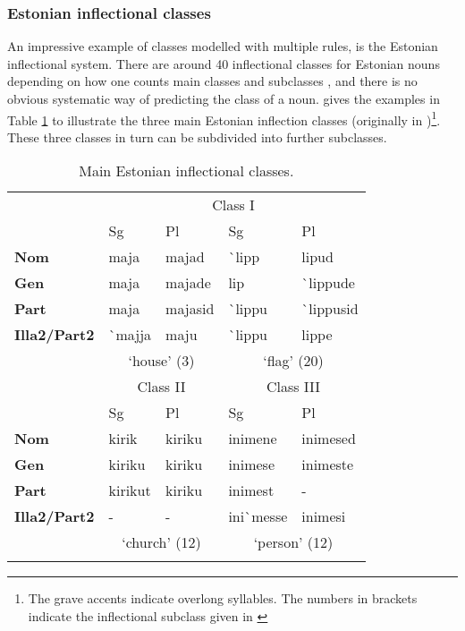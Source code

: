 \subsubsection{Estonian inflectional classes}

An impressive example of classes modelled with multiple rules, is the Estonian inflectional system. There are around 40 inflectional classes for Estonian nouns depending on how one counts main classes and subclasses \autocites{Erelt.1995, Erelt.1997, Murk.1997, Blevins.2008}, and there is no obvious systematic way of predicting the class of a noun. \textcite[p. 242]{Blevins.2008} gives the examples in Table \ref{tab:estonian-classes} to illustrate the three main Estonian inflection classes (originally in \cite{OZ.2006})\footnote{The grave accents indicate overlong syllables. The numbers in brackets indicate the inflectional subclass given in \autocite{OZ.2006}}. These three classes in turn can be subdivided into further subclasses.


\begin{table}[!htpb]
    \caption{Main Estonian inflectional classes.}\label{tab:estonian-classes}
    \centering
    \begin{tabular}{lllll}
      \lsptoprule
      & \multicolumn{4}{c}{Class I}  \\

      & Sg        & Pl      & Sg        & Pl          \\
      \midrule
      \textbf{Nom}         & maja      & majad   & \`{}lipp  & lipud         \\
      \textbf{Gen}         & maja      & majade  & lip       & \`{}lippude   \\
      \textbf{Part}        & maja      & majasid & \`{}lippu & \`{}lippusid  \\
      \textbf{Illa2/Part2} & \`{}majja & maju    & \`{}lippu & lippe         \\
      \midrule
      & \multicolumn{2}{c}{`house' (3)} & \multicolumn{2}{c}{`flag' (20)}\\
      \midrule
      & \multicolumn{2}{c}{Class II} & \multicolumn{2}{c}{Class III}\\
                  & Sg      & Pl     & Sg           & Pl\\
      \midrule
      \textbf{Nom}         & kirik   & kiriku & inimene      & inimesed\\
      \textbf{Gen}         & kiriku  & kiriku & inimese      & inimeste\\
      \textbf{Part}        & kirikut & kiriku & inimest      & -       \\
      \textbf{Illa2/Part2} & -       & -      & ini\`{}messe & inimesi \\
      \midrule
       & \multicolumn{2}{c}{`church' (12)} & \multicolumn{2}{c}{`person' (12)} \\
      \lspbottomrule
  \end{tabular}
\end{table}

